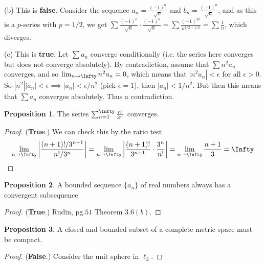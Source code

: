 \documentclass[oneside]{amsart}
\theoremstyle{definition}
\newtheorem{prop}{Proposition}[section]
\begin{document}
(b) This is \textbf{false}. Consider the sequence $a_n =  \frac{(-1)^n}{\sqrt{n}}$ and $b_n = \frac{(-1)^n}{\sqrt{n}}$, and as this is a $p$-series with $p=1/2$, we get $\sum \frac{(-1)^n}{\sqrt{n}} \cdot  \frac{(-1)^n}{\sqrt{n}} = \sum \frac{(-1)^{2n}}{n^{1/2 + 1/2} } = \sum \frac{1}{n}$, which diverges. 

(c) This is \textbf{true}. Let $\sum a_n$ converge conditionally (i.e. the series here converges but does not converge absolutely). By contradiction, assume that $ \sum n^2a_n$ converges, and so $\lim _{n\to \Infty} n^2a_n =0$, which means that $|n^2a_n| < \epsilon$ for all $\epsilon > 0$. So $|n^2| |a_n| < \epsilon \implies |a_n| < \epsilon/n^2$ (pick $\epsilon =1$), then $|a_n| < 1/n^2$. But then this means that $\sum a_n$ converges absolutely. Thus a contradiction.

\begin{prop}
The series $\sum_{n=1}^\Infty \frac{n!}{3^n}$ converges.	
\end{prop}
\begin{proof}(\textbf{True}.) We can check this by the ratio test 
\[
\lim_{n\to \Infty} \left | \frac{(n+1)!/3^{n+1}}{n!/3^n}\right| = \lim _{n\to \Infty} \left | \frac{(n+1)!}{3^{n+1}} \cdot \frac{3^n}{n!} \right | = \lim_{n \to \Infty} \frac{n+1}{3} = \Infty 
\]
\end{proof}

\begin{prop}
A bounded sequence $\{a_n \}$ of real numbers always has a convergent subsequence	
\end{prop}
\begin{proof}
	(\textbf{True}.) Rudin, pg.$51$ Theorem $3.6 (b)$.
\end{proof}


\begin{prop}
A closed and bounded subset of a complete metric space must be compact.	
\end{prop}

\begin{proof}
	(\textbf{False}.) Consider the unit sphere in $\ell_2$.
\end{proof}
\end{document}
